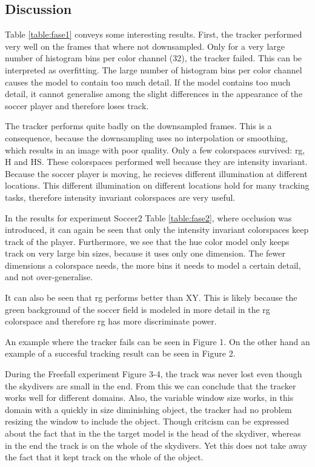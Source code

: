 \documentclass[a4paper,11pt]{article}
\begin{document}
\subsection{Discussion}
Table \ref{table:fase1} conveys some interesting results. First, the tracker performed very well on the frames that where not
downsampled. Only for a very large number of histogram bins per color channel (32), the tracker failed. This can be
interpreted as overfitting. The large number of histogram bins per color channel causes the model to
contain too much detail. If the model contains too much detail, it cannot
generalise among the slight differences in the appearance  of the soccer player and therefore loses track.

The tracker performs quite badly on the downsampled frames. This is a consequence, because  the downsampling uses no interpolation or smoothing, which results in an image with poor quality. Only a few colorspaces
survived: rg, H and HS. These colorspaces performed well because they are
intensity invariant. Because the soccer player is moving, he recieves different
illumination at different locations. This different illumination on different
locations hold for many tracking tasks, therefore intensity
invariant colorspaces are very useful.

In the results for experiment Soccer2 Table \ref{table:fase2}, where occlusion was introduced, it can again be seen  that only the intensity
invariant colorspaces keep track of the player. Furthermore, we see that the hue
color model only keeps track on very large bin sizes, because it uses
only one dimension. The fewer dimensions a colorspace needs, the more bins it
needs to model a certain detail, and not over-generalise.

It can also be seen that rg performs better than XY. This is likely because the green
background of the soccer field is modeled in more detail in the rg colorspace and
therefore rg has more discriminate power.

An example where the tracker fails can be seen in Figure 1. On the
other hand an example of a succesful tracking result can be seen in
Figure 2.

During the Freefall experiment Figure 3-4, the track was never lost even though the skydivers are small in the end. From this we can conclude that the tracker works well for different domains. Also, the variable window size works, in this domain with a quickly in size diminishing object, the tracker had no problem resizing the window to include the object. Though critcism can be expressed about the fact that in the the target model is the head of the skydiver, whereas in the end the track is on the whole of the skydivers. Yet this does not take away the fact that it kept track on the whole of the object.  
\end{document}
